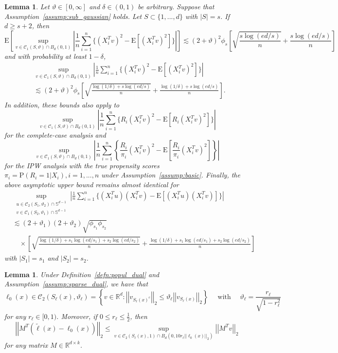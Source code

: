 \documentclass[10pt,a4paper]{amsart}
\theoremstyle{plain}
\newtheorem{lemma}[theorem]{Lemma}
\theoremstyle{remark}
\renewcommand{\tilde}{\widetilde}
\newcommand{\norm}[1]{\left|\left| #1 \right|\right|}
\begin{document}
\begin{lemma}
	\label{lem:gram_mat_conc}
	Let $\vartheta \in [0,\infty]$ and $\delta \in (0,1)$ be arbitrary. Suppose that Assumption~\ref{assump:sub_gaussian} holds. Let $S\subset \{1,...,d\}$ with $|S|=s$. If $d\geq s+2$, then 
	$$\mathrm{E}\left[\sup_{v\in \mathcal{C}_1(S,\vartheta) \cap B_d(0,1)} \left|\frac{1}{n}\sum_{i=1}^n \Big\{(X_i^T v)^2 - \mathrm{E}\left[(X_i^T v)^2 \right]\Big\}\right|\right] \lesssim (2+\vartheta)^2 \phi_s \left[\sqrt{\frac{s\log(ed/s)}{n}} + \frac{s\log(ed/s)}{n} \right]$$
	and with probability at least $1-\delta$,
	\begin{align*}
		&\sup_{v\in \mathcal{C}_1(S,\vartheta) \cap B_d(0,1)} \left|\frac{1}{n}\sum_{i=1}^n \Big\{(X_i^T v)^2 - \mathrm{E}\left[(X_i^T v)^2 \right]\Big\}\right| \\
		&\lesssim (2+\vartheta)^2 \phi_s \left[\sqrt{\frac{\log(1/\delta) + s\log(ed/s)}{n}} + \frac{\log(1/\delta)  + s\log(ed/s)}{n} \right].
	\end{align*}
	In addition, these bounds also apply to
	$$\sup_{v\in \mathcal{C}_1(S,\vartheta) \cap B_d(0,1)} \left|\frac{1}{n}\sum_{i=1}^n \Big\{R_i(X_i^T v)^2 - \mathrm{E}\left[R_i(X_i^T v)^2 \right]\Big\}\right|$$
	for the complete-case analysis and 
	$$\sup_{v\in \mathcal{C}_1(S,\vartheta) \cap B_d(0,1)} \left|\frac{1}{n}\sum_{i=1}^n \left\{\frac{R_i}{\pi_i}(X_i^T v)^2 - \mathrm{E}\left[\frac{R_i}{\pi_i}(X_i^T v)^2 \right]\right\}\right|$$
	for the IPW analysis with the true propensity scores $\pi_i = \mathrm{P}(R_i=1|X_i), i=1,...,n$ under Assumption~\ref{assump:basic}.
	Finally, the above asymptotic upper bound remains almost identical for 
	\begin{align*}
		&\sup_{\substack{u \in \mathcal{C}_2(S_1,\vartheta_2) \cap \mathbb{S}^{d-1}\\v\in \mathcal{C}_1(S_2,\vartheta_1) \cap \mathbb{S}^{d-1}}} \left|\frac{1}{n}\sum_{i=1}^n \Big\{(X_i^T u)(X_i^T v) - \mathrm{E}\left[(X_i^Tu)(X_i^T v) \right]\Big\}\right|\\
		&\lesssim (2+\vartheta_1) (2+\vartheta_2) \sqrt{\phi_{s_1}\phi_{s_2}}\\
		&\quad \times  \left[\sqrt{\frac{\log(1/\delta) + s_1\log(ed/s_1) + s_2\log(ed/s_2)}{n}} + \frac{\log(1/\delta) + s_1\log(ed/s_1) + s_2\log(ed/s_2)}{n} \right]
	\end{align*}
	with $|S_1|=s_1$ and $|S_2|=s_2$.
\end{lemma}

\begin{lemma}
	\label{lem:dual_approx_cone}
	Under Definition~\ref{defn:popul_dual} and Assumption~\ref{assump:sparse_dual}, we have that
	$$\ell_0(x) \in \mathcal{C}_2\left(S_{\ell}(x),\vartheta_{\ell}\right)=\left\{v\in \mathbb{R}^d: \norm{v_{S_{\ell}(x)^c}}_2 \leq \vartheta_{\ell} \norm{v_{S_{\ell}(x)}}_2 \right\}\quad \text{ with } \quad \vartheta_{\ell}=\frac{r_{\ell}}{\sqrt{1-r_{\ell}^2}}$$
	for any $r_{\ell}\in [0,1)$. Moreover, if $0\leq r_{\ell} \leq \frac{1}{2}$, then $$\norm{M^T\left(\tilde{\ell}(x)-\ell_0(x)\right)}_2 \leq \sup_{v\in \mathcal{C}_2(S_{\ell}(x),1) \cap B_d\left(0,10r_{\ell}\norm{\ell_0(x)}_2\right)} \norm{M^T v}_2$$ 
	for any matrix $M\in \mathbb{R}^{d\times k}$.
\end{lemma}
\end{document}
